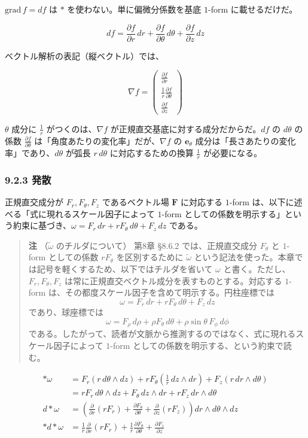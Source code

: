 \documentclass[a4paper,12pt,openany]{book}
\begin{document}
\(\mathrm{grad}\,f = df\) は \(\ast\) を使わない。単に偏微分係数を基底
\(1\)-form に載せるだけだ。

\[df = \frac{\partial f}{\partial r}\,dr + \frac{\partial f}{\partial \theta}\,d\theta + \frac{\partial f}{\partial z}\,dz\]

ベクトル解析の表記（縦ベクトル）では、

\[
\nabla f
=
\begin{pmatrix}
\frac{\partial f}{\partial r}\\[0.4em]
\frac{1}{r}\frac{\partial f}{\partial \theta}\\[0.4em]
\frac{\partial f}{\partial z}
\end{pmatrix}
\]

\(\theta\) 成分に \(\frac{1}{r}\) がつくのは、\(\nabla f\)
が正規直交基底に対する成分だからだ。\(df\) の \(d\theta\) の係数
\(\frac{\partial f}{\partial\theta}\)
は「角度あたりの変化率」だが、\(\nabla f\) の \(\mathbf{e}_\theta\)
成分は「長さあたりの変化率」であり、\(d\theta\) が弧長 \(r\,d\theta\)
に対応するための換算 \(\frac{1}{r}\) が必要になる。

\hypertarget{ux767aux6563-2}{%
\subsubsection{9.2.3 発散}\label{ux767aux6563-2}}

正規直交成分が \(F_r,F_\theta,F_z\) であるベクトル場 \(\mathbf{F}\)
に対応する \(1\)-form は、以下に述べる「式に現れるスケール因子によって
\(1\)-form
としての係数を明示する」という約束に基づき、\(\omega = F_r\,dr + rF_\theta\,d\theta + F_z\,dz\)
である。

\begin{quote}
\textbf{注} （\(\tilde{\omega}\) のチルダについて） 第8章 §8.6.2
では、正規直交成分 \(F_\theta\) と \(1\)-form としての係数 \(rF_\theta\)
を区別するために \(\tilde{\omega}\)
という記法を使った。本章では記号を軽くするため、以下ではチルダを省いて
\(\omega\) と書く。ただし、\(F_r,F_\theta,F_z\)
は常に正規直交ベクトル成分を表すものとする。対応する \(1\)-form
は、その都度スケール因子を含めて明示する。円柱座標では \[
\omega = F_r\,dr + rF_\theta\,d\theta + F_z\,dz
\] であり、球座標では \[
\omega = F_\rho\,d\rho + \rho F_\theta\,d\theta + \rho\sin\theta\,F_\phi\,d\phi
\]
である。したがって、読者が文脈から推測するのではなく、式に現れるスケール因子によって
\(1\)-form としての係数を明示する、という約束で読む。
\end{quote}

\[\begin{aligned}
\ast\omega &= F_r(r\,d\theta\wedge dz) + rF_\theta\!\left(\frac{1}{r}\,dz\wedge dr\right) + F_z(r\,dr\wedge d\theta) \\
&= rF_r\,d\theta\wedge dz + F_\theta\,dz\wedge dr + rF_z\,dr\wedge d\theta \\[0.3em]
d\ast\omega &= \left(\frac{\partial}{\partial r}(rF_r) + \frac{\partial F_\theta}{\partial\theta} + \frac{\partial}{\partial z}(rF_z)\right) dr\wedge d\theta\wedge dz \\[0.3em]
\ast d\ast\omega &= \frac{1}{r}\frac{\partial}{\partial r}(rF_r) + \frac{1}{r}\frac{\partial F_\theta}{\partial\theta} + \frac{\partial F_z}{\partial z}
\end{aligned}\]
\end{document}
